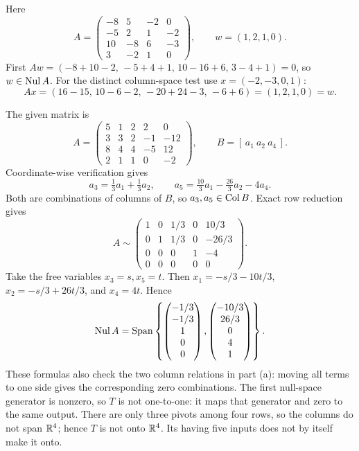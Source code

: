 Here
\[
 A=\begin{pmatrix}-8&5&-2&0\\-5&2&1&-2\\10&-8&6&-3\\3&-2&1&0\end{pmatrix},
 \qquad w=(1,2,1,0).
\]
First
$Aw=(-8+10-2,\,-5+4+1,\,10-16+6,\,3-4+1)=0$, so $w\in\operatorname{Nul} A$.
For the distinct column-space test use $x=(-2,-3,0,1)$:
\[
 Ax=(16-15,\,10-6-2,\,-20+24-3,\,-6+6)=(1,2,1,0)=w.
\]

The given matrix is
\[
 A=\begin{pmatrix}
 5&1&2&2&0\\3&3&2&-1&-12\\8&4&4&-5&12\\2&1&1&0&-2
 \end{pmatrix},\qquad B=[\,a_1\ a_2\ a_4\,].
\]
Coordinate-wise verification gives
\[
 a_3=\tfrac13a_1+\tfrac13a_2,\qquad
 a_5=\tfrac{10}3a_1-\tfrac{26}3a_2-4a_4.
\]
Both are combinations of columns of $B$, so $a_3,a_5\in\operatorname{Col} B$.
Exact row reduction gives
\[
 A\sim\begin{pmatrix}
 1&0&1/3&0&10/3\\0&1&1/3&0&-26/3\\0&0&0&1&-4\\0&0&0&0&0
 \end{pmatrix}.
\]
Take the free variables $x_3=s,x_5=t$. Then
$x_1=-s/3-10t/3$, $x_2=-s/3+26t/3$, and $x_4=4t$.
Hence
\[
 \operatorname{Nul} A=\operatorname{Span}\left\{
 \begin{pmatrix}-1/3\\-1/3\\1\\0\\0\end{pmatrix},
 \begin{pmatrix}-10/3\\26/3\\0\\4\\1\end{pmatrix}\right\}.
\]
These formulas also check the two column relations in part (a): moving
all terms to one side gives the corresponding zero combinations.
The first null-space generator is nonzero, so $T$ is not one-to-one: it
maps that generator and zero to the same output. There are only three
pivots among four rows, so the columns do not span $\mathbb{R}^4$; hence $T$ is
not onto $\mathbb{R}^4$. Its having five inputs does not by itself make it onto.

